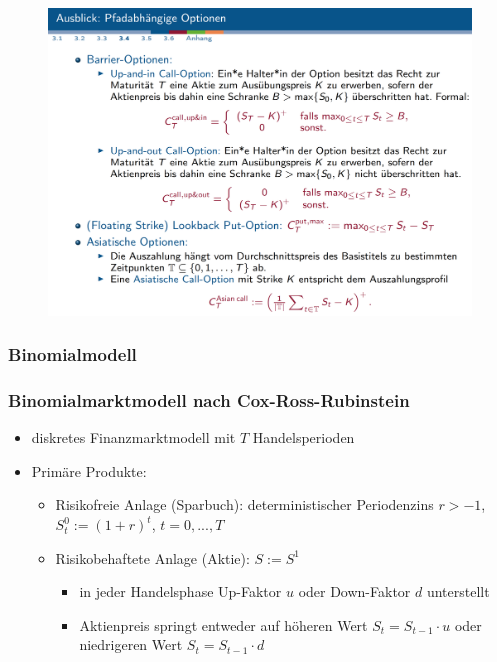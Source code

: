 \documentclass[12pt]{report}
\theoremstyle{dotless}
\theoremstyle{definition}
\begin{document}
\begin{figure}[H]
\centering
\includegraphics[width=\textwidth]{Bilder/AusblickOptionen.png}
\end{figure}

\subsubsection{Binomialmodell}

\subsubsection{Binomialmarktmodell nach Cox-Ross-Rubinstein}

\begin{itemize}
	\item diskretes Finanzmarktmodell mit $T$ Handelsperioden
	\item Prim\"are Produkte:
	\begin{itemize}
		\item Risikofreie Anlage (Sparbuch): deterministischer Periodenzins $r>-1$, \\ $S_t^0 := (1+r)^t$, $t=0,...,T$
		\item Risikobehaftete Anlage (Aktie): $S:=S^1$
		\begin{itemize}
			\item in jeder Handelsphase Up-Faktor $u$ oder Down-Faktor $d$ unterstellt
			\item Aktienpreis springt entweder auf h\"oheren Wert $S_t = S_{t-1} \cdot u$ oder niedrigeren Wert $S_t = S_{t-1} \cdot d$
		\end{itemize}
	\end{itemize}
\end{itemize}
\end{document}
